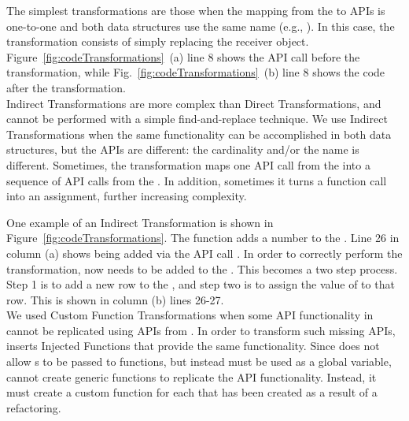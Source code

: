 \documentclass[preprint]{sigplanconf}
\begin{document}
 The simplest transformations are those when the mapping from the \NC{} to \CDT APIs is one-to-one and both data structures use the same name (e.g., ). In this case, the transformation consists of simply replacing the receiver object. 
Figure~\ref{fig:codeTransformations}~(a) line 8 shows the API call before the transformation, while Fig.~\ref{fig:codeTransformations}~(b) line 
8 shows the code after the transformation.\\

Indirect Transformations are more complex than Direct Transformations, and cannot be performed with a simple find-and-replace technique. We use Indirect Transformations when the same functionality can be accomplished in both data structures, but the APIs are different: the cardinality and/or the name is different. Sometimes, the transformation maps one API call from the \NC{} into a sequence of API calls from the \CDT{}. In addition, sometimes it turns a function call into an assignment, further increasing complexity.

One example of an Indirect Transformation is shown in Figure~\ref{fig:codeTransformations}. 
The function  adds a number to the  \NC{}. Line 26 in column (a) shows  being added via the API call .
In order to correctly perform the transformation,  now needs to be added to the  .
This becomes a two step process. Step 1 is to add a new row to the \CDT, and step two is to assign the value of  to that row. This is shown in column (b) lines 26-27. \\


We used Custom Function Transformations when some API functionality in \NC{} cannot be replicated using APIs from \CDT{}.
In order to transform such missing APIs, \tool inserts Injected Functions that provide the same functionality.  
Since \TD does not allow \CDT{}s to be passed to functions, but instead must be used as a global variable, \tool cannot create generic functions to replicate the API functionality.  
Instead, it must create a custom function for each \CDT that has been created as a result of a refactoring. 
\end{document}
